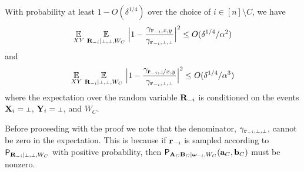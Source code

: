 \begin{lemma}\label{lem:norms-are-close}
With probability at least $1 - O(\delta^{1/4})$ over the choice of $i \in [n] \setminus C$, we have
	\begin{equation}
	\label{eq:norms-are-close-s0}
		\Ex_{XY} \, \Ex_{\bR_\mi | \dummy, \dummy, W_C} \, \Big | 1 - \frac{\gamma_{\br_\mi, x,y}}{\gamma_{\br_\mi,\dummy,\dummy}} \Big |^2 \leq O(\delta^{1/4}/\alpha^2)
	\end{equation}
	and
	\begin{equation}
	\label{eq:norms-are-close-s1}
		\Ex_{XY} \, \Ex_{\bR_\mi | \dummy, \dummy, W_C} \, \Big | 1 - \frac{\gamma_\sspxy}{\gamma_{\br_\mi,\dummy,\dummy}} \Big |^2 \leq O(\delta^{1/4}/\alpha^3)
	\end{equation}
	where the expectation over the random variable $\mathbf{R}_{-i}$ is conditioned on the events $\bX_i = \dummy$, $\bY_i = \dummy$, and $W_C$. 
\end{lemma}
Before proceeding with the proof we note that the denominator, $\gamma_\sspp$, cannot be zero in the expectation. This is because if $\mathbf{r}_{-i}$ is sampled according to $\P_{\bR_\mi | \dummy, \dummy, W_C}$ with positive probability, then $\mathsf{P}_{\mathbf{A}_C \mathbf{B}_C | {\boldsymbol{\omega}}_{-i}, W_C}(\mathbf{a}_C,\mathbf{b}_C)$ must be nonzero. 


